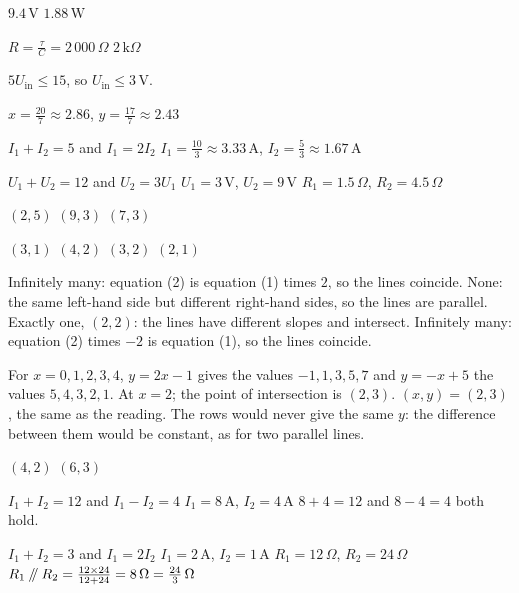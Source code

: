 
\begin{facit}

  $9.4\,\text{V}$  $1.88\,\text{W}$

  $R = \frac{\tau}{C} = 2\,000\,\Omega$
 $2\,\text{k}\Omega$

 $5U_{\text{in}} \leq 15$, so $U_{\text{in}} \leq 3\,\text{V}$.

 $x = \frac{20}{7} \approx 2.86$, $y = \frac{17}{7} \approx 2.43$

  $I_1 + I_2 = 5$ and $I_1 = 2I_2$
 $I_1 = \frac{10}{3} \approx 3.33\,\text{A}$, $I_2 = \frac{5}{3} \approx 1.67\,\text{A}$

  $U_1 + U_2 = 12$ and $U_2 = 3U_1$
 $U_1 = 3\,\text{V}$, $U_2 = 9\,\text{V}$
 $R_1 = 1.5\,\Omega$, $R_2 = 4.5\,\Omega$

  $(2, 5)$  $(9, 3)$  $(7, 3)$

  $(3, 1)$  $(4, 2)$  $(3, 2)$  $(2, 1)$

  Infinitely many: equation (2) is equation (1) times $2$, so the lines coincide.
 None: the same left-hand side but different right-hand sides, so the lines are parallel.
 Exactly one, $(2, 2)$: the lines have different slopes and intersect.
 Infinitely many: equation (2) times $-2$ is equation (1), so the lines coincide.

  For $x = 0, 1, 2, 3, 4$, $y = 2x - 1$ gives the values $-1, 1, 3, 5, 7$ and
$y = -x + 5$ the values $5, 4, 3, 2, 1$.
 At $x = 2$; the point of intersection is $(2, 3)$.
 $(x, y) = (2, 3)$, the same as the reading.
 The rows would never give the same $y$: the difference between them would be constant, as
for two parallel lines.

  $(4, 2)$  $(6, 3)$

  $I_1 + I_2 = 12$ and $I_1 - I_2 = 4$
 $I_1 = 8\,\text{A}$, $I_2 = 4\,\text{A}$
 $8 + 4 = 12$ and $8 - 4 = 4$ both hold.

  $I_1 + I_2 = 3$ and $I_1 = 2I_2$
 $I_1 = 2\,\text{A}$, $I_2 = 1\,\text{A}$
 $R_1 = 12\,\Omega$, $R_2 = 24\,\Omega$
 $R_1 \mathbin{/\mkern-5mu/} R_2 = \frac{12 \times 24}{12 + 24} = 8\,\Omega = \frac{24}{3}\,\Omega$


\end{facit}
